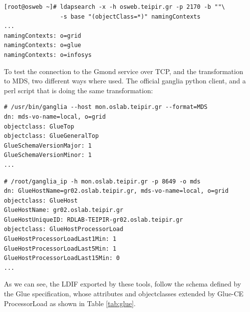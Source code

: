 \begin{verbatim}
[root@osweb ~]# ldapsearch -x -h osweb.teipir.gr -p 2170 -b ""\
                -s base "(objectClass=*)" namingContexts
...
namingContexts: o=grid
namingContexts: o=glue
namingContexts: o=infosys
\end{verbatim}

To test the connection to the Gmond service over TCP, and the transformation to MDS, two different ways where used. The official ganglia python client, and a perl script that is doing the same transformation:

\begin{lstlisting}
# /usr/bin/ganglia --host mon.oslab.teipir.gr --format=MDS
dn: mds-vo-name=local, o=grid
objectclass: GlueTop
objectclass: GlueGeneralTop
GlueSchemaVersionMajor: 1
GlueSchemaVersionMinor: 1
...
\end{lstlisting}

\begin{lstlisting}
# /root/ganglia_ip -h mon.oslab.teipir.gr -p 8649 -o mds
dn: GlueHostName=gr02.oslab.teipir.gr, mds-vo-name=local, o=grid
objectclass: GlueHost
GlueHostName: gr02.oslab.teipir.gr
GlueHostUniqueID: RDLAB-TEIPIR-gr02.oslab.teipir.gr
objectclass: GlueHostProcessorLoad
GlueHostProcessorLoadLast1Min: 1
GlueHostProcessorLoadLast5Min: 1
GlueHostProcessorLoadLast15Min: 0
...
\end{lstlisting}

As we can see, the LDIF exported by these tools, follow the schema defined by the Glue specification, whose attributes and objectclasses extended by Glue-CE ProcessorLoad as shown in Table \ref{tab:glue}.


